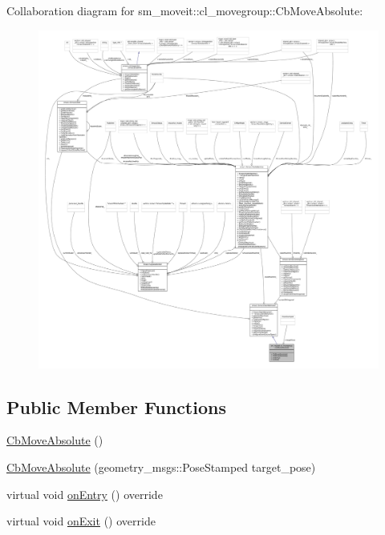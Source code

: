Collaboration diagram for sm\+\_\+moveit\+:\+:cl\+\_\+movegroup\+:\+:Cb\+Move\+Absolute\+:
\nopagebreak
\begin{figure}[H]
\begin{center}
\leavevmode
\includegraphics[width=350pt]{classsm__moveit_1_1cl__movegroup_1_1CbMoveAbsolute__coll__graph}
\end{center}
\end{figure}
\subsection*{Public Member Functions}
\begin{DoxyCompactItemize}
\item 
\hyperlink{classsm__moveit_1_1cl__movegroup_1_1CbMoveAbsolute_ac5f4f62028add1d559debec021dbdae6}{Cb\+Move\+Absolute} ()
\item 
\hyperlink{classsm__moveit_1_1cl__movegroup_1_1CbMoveAbsolute_a88a650615f4f24502e8089026c6298d0}{Cb\+Move\+Absolute} (geometry\+\_\+msgs\+::\+Pose\+Stamped target\+\_\+pose)
\item 
virtual void \hyperlink{classsm__moveit_1_1cl__movegroup_1_1CbMoveAbsolute_a25270a36013f6bda969f6f8e832053cf}{on\+Entry} () override
\item 
virtual void \hyperlink{classsm__moveit_1_1cl__movegroup_1_1CbMoveAbsolute_aa96ee28b46a3fc9e2d70eae302ffb5c7}{on\+Exit} () override
\end{DoxyCompactItemize}
